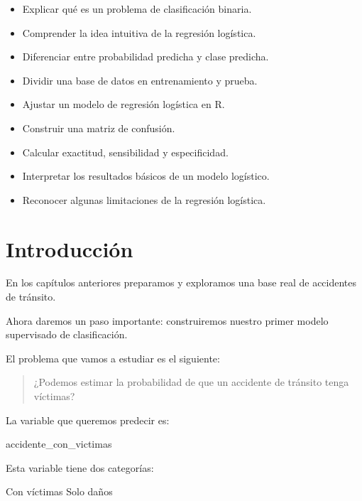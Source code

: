 \documentclass[
  11pt,
  letterpaper,
]{book}
\newenvironment{Shaded}{\begin{snugshade}}{\end{snugshade}}
\newcommand{\NormalTok}[1]{\textcolor[rgb]{0.00,0.23,0.31}{#1}}
\providecommand{\tightlist}{%
  \setlength{\itemsep}{0pt}\setlength{\parskip}{0pt}}
\begin{document}
\begin{itemize}
\tightlist
\item
  Explicar qué es un problema de clasificación binaria.
\item
  Comprender la idea intuitiva de la regresión logística.
\item
  Diferenciar entre probabilidad predicha y clase predicha.
\item
  Dividir una base de datos en entrenamiento y prueba.
\item
  Ajustar un modelo de regresión logística en R.
\item
  Construir una matriz de confusión.
\item
  Calcular exactitud, sensibilidad y especificidad.
\item
  Interpretar los resultados básicos de un modelo logístico.
\item
  Reconocer algunas limitaciones de la regresión logística.
\end{itemize}

\section{Introducción}\label{introducciuxf3n-3}

En los capítulos anteriores preparamos y exploramos una base real de
accidentes de tránsito.

Ahora daremos un paso importante: construiremos nuestro primer modelo
supervisado de clasificación.

El problema que vamos a estudiar es el siguiente:

\begin{quote}
¿Podemos estimar la probabilidad de que un accidente de tránsito tenga
víctimas?
\end{quote}

La variable que queremos predecir es:

\begin{Shaded}
\begin{Highlighting}[]
\NormalTok{accidente\_con\_victimas}
\end{Highlighting}
\end{Shaded}

Esta variable tiene dos categorías:

\begin{Shaded}
\begin{Highlighting}[]
\NormalTok{Con víctimas}
\NormalTok{Solo daños}
\end{Highlighting}
\end{Shaded}
\end{document}
